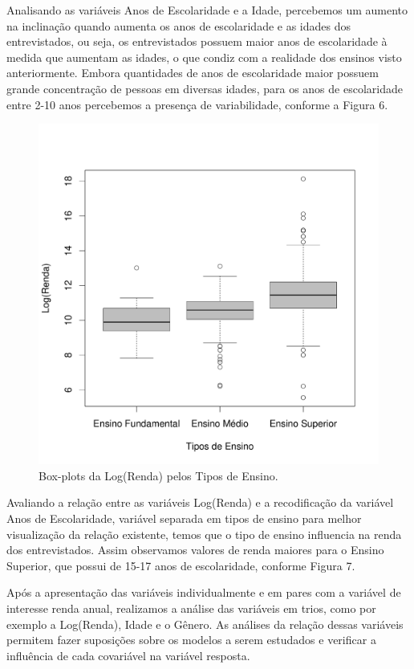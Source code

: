 \documentclass[]{article}
\begin{document}
Analisando as variáveis Anos de Escolaridade e a Idade, percebemos um
aumento na inclinação quando aumenta os anos de escolaridade e as idades
dos entrevistados, ou seja, os entrevistados possuem maior anos de
escolaridade à medida que aumentam as idades, o que condiz com a
realidade dos ensinos visto anteriormente. Embora quantidades de anos de
escolaridade maior possuem grande concentração de pessoas em diversas
idades, para os anos de escolaridade entre 2-10 anos percebemos a
presença de variabilidade, conforme a Figura 6.

\begin{figure}[H]

{\centering \includegraphics[width=0.6\linewidth]{p21-graf} 

}

\caption{Box-plots da Log(Renda) pelos Tipos de Ensino.}\label{fig:unnamed-chunk-14}
\end{figure}

Avaliando a relação entre as variáveis Log(Renda) e a recodificação da
variável Anos de Escolaridade, variável separada em tipos de ensino para
melhor visualização da relação existente, temos que o tipo de ensino
influencia na renda dos entrevistados. Assim observamos valores de renda
maiores para o Ensino Superior, que possui de 15-17 anos de
escolaridade, conforme Figura 7.

Após a apresentação das variáveis individualmente e em pares com a
variável de interesse renda anual, realizamos a análise das variáveis em
trios, como por exemplo a Log(Renda), Idade e o Gênero. As análises da
relação dessas variáveis permitem fazer suposições sobre os modelos a
serem estudados e verificar a influência de cada covariável na variável
resposta.
\end{document}
